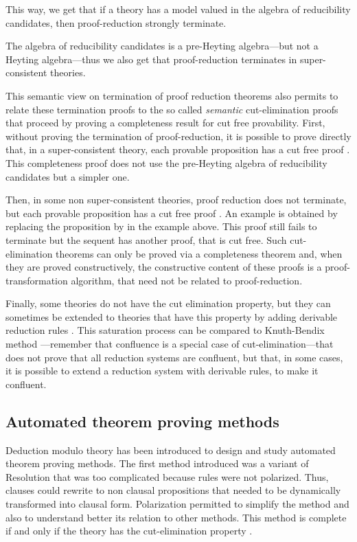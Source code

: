 \documentclass{llncs}
\begin{document}
This way, we get that if a theory has a model valued in the algebra of
reducibility candidates, then proof-reduction strongly terminate.

The algebra of reducibility candidates is a pre-Heyting algebra---but
not a Heyting algebra---thus we also get that proof-reduction
terminates in super-consistent theories.

This semantic view on termination of proof reduction theorems also
permits to relate these termination proofs to the so called {\em
  semantic} cut-elimination proofs that proceed by proving a
completeness result for cut free provability.  First, without proving
the termination of proof-reduction, it is possible to prove directly
that, in a super-consistent theory, each provable proposition has a
cut free proof \cite{DowekHermant,BHH}.  This completeness proof does not
use the pre-Heyting algebra of reducibility candidates but a simpler
one.

Then, in some non super-consistent theories, proof reduction does not
terminate, but each provable proposition has a cut free proof
\cite{Hermant05}. An example is obtained by replacing the proposition
 by  in the example above.  This proof still fails to
terminate but the sequent  has another proof, that is cut
free. Such cut-elimination theorems can only be proved via a
completeness theorem and, when they are proved constructively, the
constructive content of these proofs is a proof-transformation
algorithm, that need not be related to proof-reduction.

Finally, some theories do not have the cut elimination property, but
they can sometimes be extended to theories that have this property by adding
derivable reduction rules \cite{BurelKirchner,Burel14}. 
This saturation process can be
compared to Knuth-Bendix method \cite{KB}---remember that confluence
is a special case of cut-elimination---that does not prove that all reduction
systems are confluent, but that, in some cases, it is possible to
extend a reduction system with derivable rules, to make it confluent.

\subsection{Automated theorem proving methods}

Deduction modulo theory has been introduced to design and study
automated theorem proving methods. The first method introduced was a
variant of Resolution \cite{DHK} that was too complicated because rules
were not polarized. Thus, clauses could rewrite to non clausal
propositions that needed to be dynamically transformed into clausal form.
Polarization permitted to
simplify the method \cite{polar} and also to understand
better its relation to other methods. This method is complete if and only
if the theory has the cut-elimination property \cite{Hermant10}.
\end{document}
